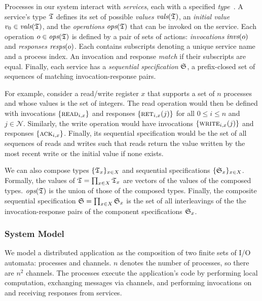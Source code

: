 Processes in our system interact with \textit{services}, each with a specified
\textit{type}~\cite{herlihy1990linearizability,lynch1996da}. A service's type
$\mathfrak{T}$ defines its set of possible \textit{values} $\operatorname*{\textit{vals}}(\mathfrak{T})$, an
\textit{initial value} $v_0 \in \operatorname*{\textit{vals}}(\mathfrak{T})$, and the \textit{operations}
$\operatorname*{\textit{ops}}(\mathfrak{T})$ that can be invoked on the service. Each operation $o \in
\operatorname*{\textit{ops}}(\mathfrak{T})$ is defined by a pair of sets of actions: \textit{invocations} $\operatorname*{\textit{invs}}(o)$ and
\textit{responses} $\operatorname*{\textit{resps}}(o)$. Each contains subscripts denoting a unique service name and a process index. An invocation and response \textit{match} if their subscripts are equal.
Finally, each service has a \textit{sequential specification} $\mathfrak{S}$, a
prefix-closed set of sequences of matching invocation-response pairs.

For example, consider a read/write register $x$ that supports a set of $n$
processes and whose values is the set of integers. The read operation would then
be defined with invocations $\{\textsc{read}_{i,x}\}$ and responses
$\{\textsc{ret}_{i,x}(j)\}$ for all $0 \leq i \leq n$ and $j \in \mathcal{N}$.
Similarly, the write operation would have invocations
$\{\textsc{write}_{i,x}(j)\}$ and responses $\{\textsc{ack}_{i,x}\}$. Finally,
its sequential specification would be the set of all sequences of reads and
writes such that reads return the value written by the most recent write or the
initial value if none exists.

We can also compose types $\{\mathfrak{T}_x\}_{x \in X}$ and sequential
specifications $\{\mathfrak{S}_x\}_{x \in X}$. Formally, the values of $\mathfrak{T} = \prod_{x
  \in X} \mathfrak{T}_x$ are vectors of the values of the composed types. $\operatorname*{\textit{ops}}(\mathfrak{T})$
is the union of those of the composed types. Finally, the composite sequential
specification $\mathfrak{S} = \prod_{x \in X} \mathfrak{S}_x$ is the set of all interleavings of the the invocation-response pairs of the component
specifications $\mathfrak{S}_x$.

\subsubsection{System Model}
\label{sec:equivalence:preliminaries:model}

We model a distributed application as the composition of two finite sets of I/O
automata: processes and channels. $n$ denotes the number of processes, so there are $n^2$ channels. The processes execute the application's code by performing local computation, exchanging messages via channels, and performing invocations on and receiving responses from services.

